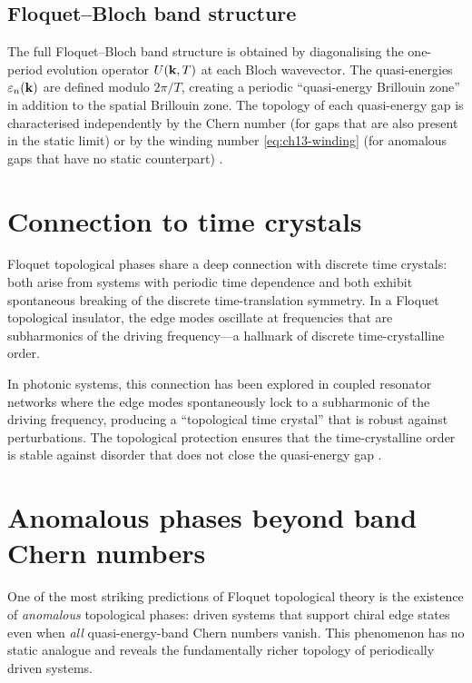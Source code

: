 \subsection{Floquet--Bloch band structure}
\label{sec:ch13-floquet-bloch-structure}

The full Floquet--Bloch band structure is obtained by diagonalising
the one-period evolution operator $U(\mathbf{k},T)$ at each Bloch
wavevector.  The quasi-energies $\varepsilon_n(\mathbf{k})$ are defined
modulo $2\pi/T$, creating a periodic ``quasi-energy Brillouin zone''
in addition to the spatial Brillouin zone.  The topology of each
quasi-energy gap is characterised independently by the Chern number
(for gaps that are also present in the static limit) or by the winding
number \eqref{eq:ch13-winding} (for anomalous gaps that have no
static counterpart)
\cite{ozawa2018topological,maczewsky2017observation}.

\section{Connection to time crystals}
\label{sec:ch13-time-crystals}

Floquet topological phases share a deep connection with discrete time
crystals: both arise from systems with periodic time dependence and
both exhibit spontaneous breaking of the discrete time-translation
symmetry.  In a Floquet topological insulator, the edge modes
oscillate at frequencies that are subharmonics of the driving
frequency---a hallmark of discrete time-crystalline order.

In photonic systems, this connection has been explored in coupled
resonator networks where the edge modes spontaneously lock to a
subharmonic of the driving frequency, producing a ``topological time
crystal'' that is robust against perturbations.  The topological
protection ensures that the time-crystalline order is stable against
disorder that does not close the quasi-energy gap
\cite{price2022roadmap,ozawa2018topological}.

\section{Anomalous phases beyond band Chern numbers}
\label{sec:ch13-anomalous-beyond-chern}

One of the most striking predictions of Floquet topological theory
is the existence of \emph{anomalous} topological phases: driven
systems that support chiral edge states even when \emph{all}
quasi-energy-band Chern numbers vanish.  This phenomenon has no
static analogue and reveals the fundamentally richer topology of
periodically driven systems.

